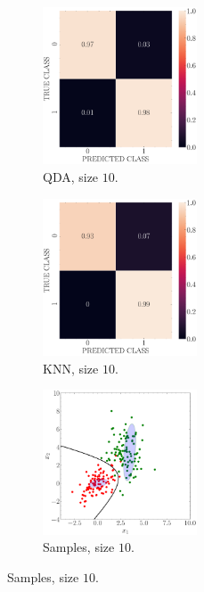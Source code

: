 \documentclass[12pt, a4 paper]{article}
\begin{document}
\begin{figure}[!htbp]
\centering
\quad \quad
    \begin{subfigure}[!htbp]{0.24\textwidth}
       \centering
       \includegraphics[width=1.8in]{../results/ex1/conf_mtx_QD_ML_dataset_P1b_size_10.pdf}
       \caption{QDA, size $10$.}
       \label{fig:QDA_P1b_10}
    \end{subfigure}
\quad \quad
    \begin{subfigure}[!htbp]{0.24\textwidth}
       \centering
       \includegraphics[width=1.8in]{../results/ex1/conf_mtx_KNN_dataset_P1b_size_10.pdf}
       \caption{KNN, size $10$.}
       \label{fig:KNN_P1b_10}
    \end{subfigure}
\quad \quad
    \begin{subfigure}[!htbp]{0.24\textwidth}
       \centering
       \includegraphics[width=1.8in]{../results/ex1/samples_QD_ML_dataset_P1b_size_10.pdf}
       \caption{Samples, size $10$.}
       \label{fig:KNN_P1b_10}
    \end{subfigure}
    

\end{figure}
\end{document}
